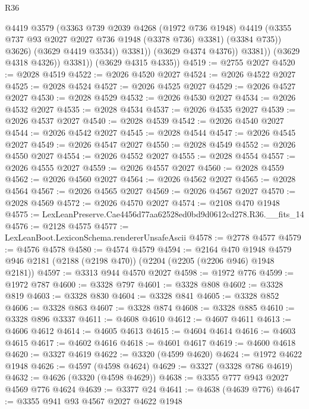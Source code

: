 \begin{lexlean}{R36}
\begin{coremodule}
                          @4419
                          @3579
                          (@3363
                            @739
                            @2039
                            @4268
                            (@1972 @736 @1948)
                            @4419
                            (@3355 @737 @93 @2027 @2027 @736 @1948 (@3378 @736) @3381)
                            (@3384 @735))
                          @3626)
                        (@3629 @4419 @3534))
                      @3381))
                  (@3629 @4374 @4376))
                @3381))
            (@3629 @4318 @4326))
          @3381))
      (@3629 @4315 @4335))
@4519 := @2755 @2027
@4520 := @2028 @4519
@4522 := @2026 @4520 @2027
@4524 := @2026 @4522 @2027
@4525 := @2028 @4524
@4527 := @2026 @4525 @2027
@4529 := @2026 @4527 @2027
@4530 := @2028 @4529
@4532 := @2026 @4530 @2027
@4534 := @2026 @4532 @2027
@4535 := @2028 @4534
@4537 := @2026 @4535 @2027
@4539 := @2026 @4537 @2027
@4540 := @2028 @4539
@4542 := @2026 @4540 @2027
@4544 := @2026 @4542 @2027
@4545 := @2028 @4544
@4547 := @2026 @4545 @2027
@4549 := @2026 @4547 @2027
@4550 := @2028 @4549
@4552 := @2026 @4550 @2027
@4554 := @2026 @4552 @2027
@4555 := @2028 @4554
@4557 := @2026 @4555 @2027
@4559 := @2026 @4557 @2027
@4560 := @2028 @4559
@4562 := @2026 @4560 @2027
@4564 := @2026 @4562 @2027
@4565 := @2028 @4564
@4567 := @2026 @4565 @2027
@4569 := @2026 @4567 @2027
@4570 := @2028 @4569
@4572 := @2026 @4570 @2027
@4574 := @2108 @470 @1948
@4575 := LexLeanPreserve.Cae4456d77aa62528ed0bd9d0612cd278.R36.__fits_14
@4576 := @2128 @4575
@4577 := LexLeanBoot.LexiconSchema.rendererUnsafeAscii
@4578 := @2778 @4577
@4579 := @4576 @4578
@4580 := @4574 @4579
@4594 := @2164
    @470
    @1948
    @4579
    @946
    @2181
    (@2188 (@2198 @470))
    (@2204 (@2205 (@2206 @946) @1948 @2181))
@4597 := @3313 @944 @4570 @2027
@4598 := @1972 @776
@4599 := @1972 @787
@4600 := @3328 @797
@4601 := @3328 @808
@4602 := @3328 @819
@4603 := @3328 @830
@4604 := @3328 @841
@4605 := @3328 @852
@4606 := @3328 @863
@4607 := @3328 @874
@4608 := @3328 @885
@4610 := @3328 @896 @3337
@4611 := @4608 @4610
@4612 := @4607 @4611
@4613 := @4606 @4612
@4614 := @4605 @4613
@4615 := @4604 @4614
@4616 := @4603 @4615
@4617 := @4602 @4616
@4618 := @4601 @4617
@4619 := @4600 @4618
@4620 := @3327 @4619
@4622 := @3320 (@4599 @4620)
@4624 := @1972 @4622 @1948
@4626 := @4597 (@4598 @4624)
@4629 := @3327 (@3328 @786 @4619)
@4632 := @4626 (@3320 (@4598 @4629))
@4638 := @3355 @777 @943 @2027 @4569 @776 @4624
@4639 := @3377 @24
@4641 := @4638 (@4639 @776)
@4647 := @3355 @941 @93 @4567 @2027 @4622 @1948

\end{coremodule}
\end{lexlean}
